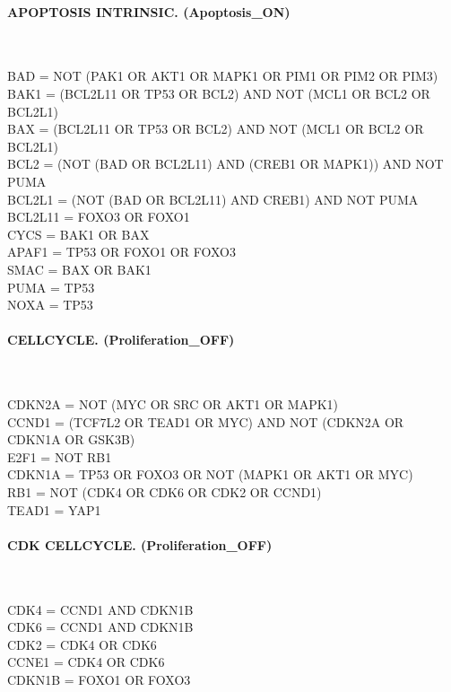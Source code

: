 \paragraph{APOPTOSIS INTRINSIC. (Apoptosis\_ON)}\mbox{}\\
\begin{flushleft}\ttfamily\small
BAD = NOT (PAK1 OR AKT1 OR MAPK1 OR PIM1 OR PIM2 OR PIM3)\\
BAK1 = (BCL2L11 OR TP53 OR BCL2) AND NOT (MCL1 OR BCL2 OR BCL2L1)\\
BAX = (BCL2L11 OR TP53 OR BCL2) AND NOT (MCL1 OR BCL2 OR BCL2L1)\\
BCL2 = (NOT (BAD OR BCL2L11) AND (CREB1 OR MAPK1)) AND NOT PUMA\\
BCL2L1 = (NOT (BAD OR BCL2L11) AND CREB1) AND NOT PUMA\\
BCL2L11 = FOXO3 OR FOXO1\\
CYCS = BAK1 OR BAX\\
APAF1 = TP53 OR FOXO1 OR FOXO3\\
SMAC = BAX OR BAK1\\
PUMA = TP53\\
NOXA = TP53\\
\end{flushleft}

\paragraph{CELLCYCLE. (Proliferation\_OFF)}\mbox{}\\
\begin{flushleft}\ttfamily\small
CDKN2A = NOT (MYC OR SRC OR AKT1 OR MAPK1)\\
CCND1 = (TCF7L2 OR TEAD1 OR MYC) AND NOT (CDKN2A OR CDKN1A OR GSK3B)\\
E2F1 = NOT RB1\\
CDKN1A = TP53 OR FOXO3 OR NOT (MAPK1 OR AKT1 OR MYC)\\
RB1 = NOT (CDK4 OR CDK6 OR CDK2 OR CCND1)\\
TEAD1 = YAP1\\
\end{flushleft}

\paragraph{CDK CELLCYCLE. (Proliferation\_OFF)}\mbox{}\\
\begin{flushleft}\ttfamily\small
CDK4 = CCND1 AND CDKN1B\\
CDK6 = CCND1 AND CDKN1B\\
CDK2 = CDK4 OR CDK6\\
CCNE1 = CDK4 OR CDK6\\
CDKN1B = FOXO1 OR FOXO3\\
\end{flushleft}

